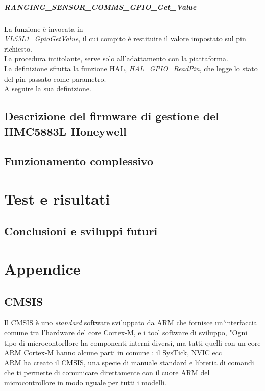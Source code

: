 \documentclass[11pt]{report}
\begin{document}
\paragraph{RANGING\_SENSOR\_COMMS\_GPIO\_Get\_Value}
La funzione è invocata in\\\textit{VL53L1\_GpioGetValue}, il cui compito è restituire il valore impostato sul pin richiesto.\\
La procedura intitolante, serve solo all'adattamento con la piattaforma.\\
La definizione sfrutta la funzione HAL, \textit{HAL\_GPIO\_ReadPin}, che legge lo stato del pin passato come parametro.\\
A seguire la sua definizione.


\section{Descrizione del firmware di gestione del HMC5883L Honeywell}
\section{Funzionamento complessivo}
\chapter{Test e risultati}
\newpage
{}
\section*{Conclusioni e sviluppi futuri}

\appendix
\chapter{Appendice}

\section{CMSIS}
Il CMSIS è uno \textit{standard} software sviluppato da ARM che
fornisce un'interfaccia comune tra l'hardware del core Cortex-M, e i tool software di sviluppo, "Ogni tipo di microcontorllore ha componenti interni 
diversi, ma tutti quelli con un core ARM Cortex-M hanno alcune parti in comune : il SysTick, NVIC ecc\\
ARM ha creato il CMSIS, una specie di manuale standard e libreria di comandi che ti permette di comunicare direttamente con il cuore ARM del microcontrollore in modo uguale per tutti i modelli.
\end{document}
